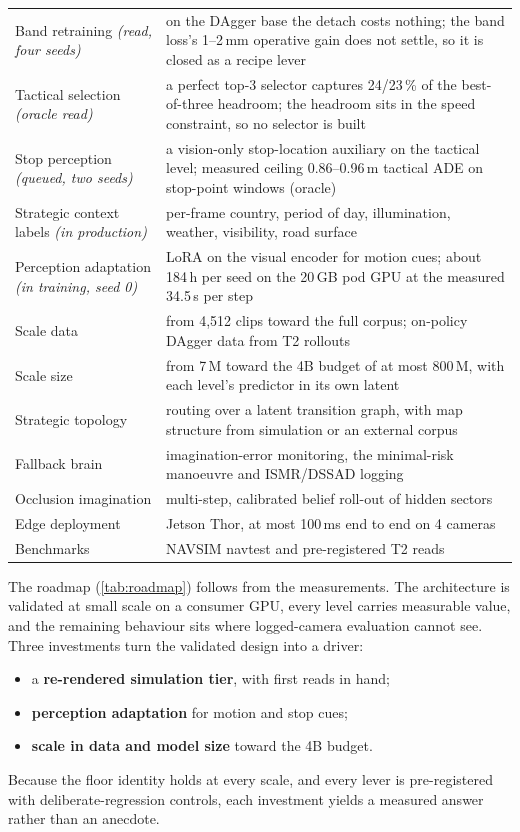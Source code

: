 \documentclass[10pt,twocolumn]{article}
\theoremstyle{remark}
\begin{document}
\begin{table}[!t]
\begin{tabularx}{\columnwidth}{@{}>{\raggedright\arraybackslash}p{24mm}>{\raggedright\arraybackslash}X@{}}
Band retraining \textit{(read, four seeds)} & on the DAgger base the detach costs nothing; the band loss's 1--2\,mm operative gain does not settle, so it is closed as a recipe lever \\
Tactical selection \textit{(oracle read)} & a perfect top-3 selector captures 24/23\,\% of the best-of-three headroom; the headroom sits in the speed constraint, so no selector is built \\
Stop perception \textit{(queued, two seeds)} & a vision-only stop-location auxiliary on the tactical level; measured ceiling 0.86--0.96\,m tactical ADE on stop-point windows (oracle) \\
Strategic context labels \textit{(in production)} & per-frame country, period of day, illumination, weather, visibility, road surface \\
Perception adaptation \textit{(in training, seed 0)} & LoRA on the visual encoder for motion cues; about 184\,h per seed on the 20\,GB pod GPU at the measured 34.5\,s per step \\
Scale data & from 4,512 clips toward the full corpus; on-policy DAgger data from T2 rollouts \\
Scale size & from 7\,M toward the 4B budget of at most 800\,M, with each level's predictor in its own latent \\
Strategic topology & routing over a latent transition graph, with map structure from simulation or an external corpus \\
Fallback brain & imagination-error monitoring, the minimal-risk manoeuvre and ISMR/DSSAD logging \\
Occlusion imagination & multi-step, calibrated belief roll-out of hidden sectors \\
Edge deployment & Jetson Thor, at most 100\,ms end to end on 4 cameras \\
Benchmarks & NAVSIM navtest and pre-registered T2 reads \\
\bottomrule
\end{tabularx}
\end{table}

The roadmap (\cref{tab:roadmap}) follows from the measurements. The architecture is validated at small scale on a consumer GPU,
every level carries measurable value, and the remaining behaviour sits where logged-camera evaluation cannot see. Three investments
turn the validated design into a driver:
\begin{itemize}
  \item a \textbf{re-rendered simulation tier}, with first reads in hand;
  \item \textbf{perception adaptation} for motion and stop cues;
  \item \textbf{scale in data and model size} toward the 4B budget.
\end{itemize}
Because the floor identity holds at every scale, and every lever is pre-registered with deliberate-regression controls, each
investment yields a measured answer rather than an anecdote.
\end{document}
